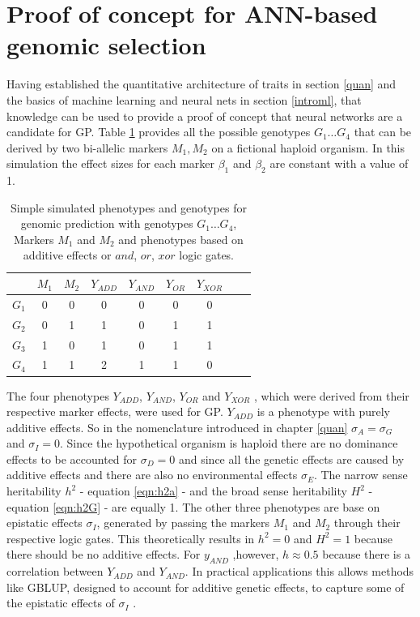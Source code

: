 \section{Proof of concept for ANN-based genomic selection} \label{POC}

Having established the quantitative architecture of traits in section \ref{quan} and the
basics of machine learning and neural nets in section \ref{introml}, that knowledge can be
used to provide a proof of concept that neural networks are a candidate for GP. Table
\ref{tab:simmarker} provides all the possible genotypes $G_1 \dots G_4$ that can be
derived by two bi-allelic markers $M_1,M_2$ on a fictional haploid organism. In this
simulation the effect sizes for each marker $\beta_1$ and $\beta_2$ are constant with a
value of 1.

\begin{table}[H]
  \caption{Simple simulated phenotypes and genotypes for genomic prediction with genotypes
    $G_1 \dots G_4$, Markers $M_1$ and $M_2$ and phenotypes based on additive effects or
    $and$, $or$, $xor$ logic gates.}
\label{tab:simmarker}
\centering
\begin{tabular}{ l c c | c c c c c c }
  \toprule
  & $M_1$ & $M_2$ & $Y_{ADD}$ & $Y_{AND}$ & $Y_{OR}$ & $Y_{XOR}$\\
  \midrule
  $G_1$ & 0 & 0 & 0 & 0 & 0 & 0 \\
  $G_2$ & 0 & 1 & 1 & 0 & 1 & 1 \\
  $G_3$ & 1 & 0 & 1 & 0 & 1 & 1 \\
  $G_4$ & 1 & 1 & 2 & 1 & 1 & 0 \\
  \bottomrule
\end{tabular}
\end{table}

The four phenotypes $Y_{ADD}$, $Y_{AND}$, $Y_{OR}$ and $Y_{XOR}$ , which were derived from
their respective marker effects, were used for GP. $Y_{ADD}$ is a phenotype with purely
additive effects. So in the nomenclature introduced in chapter \ref{quan}
$\sigma_A = \sigma_G$ and $\sigma_{I} = 0$. Since the hypothetical organism is haploid
there are no dominance effects to be accounted for $\sigma_D = 0$ and since all the
genetic effects are caused by additive effects and there are also no environmental effects
$\sigma_E$.  The narrow sense heritability $h^2$ - equation \ref{eqn:h2a} - and the broad
sense heritability $H^2$ - equation \ref{eqn:h2G} - are equally 1. The other three
phenotypes are base on epistatic effects $\sigma_I$, generated by passing the markers
$M_1$ and $M_2$ through their respective logic gates. This theoretically results in
$h^2 = 0$ and $H^2 = 1$ because there should be no additive effects. For $y_{AND}$
,however, $h \approx 0.5$ because there is a correlation between $Y_{ADD}$ and
$Y_{AND}$. In practical applications this allows methods like GBLUP, designed to account
for additive genetic effects, to capture some of the epistatic effects of $\sigma_I$
\cite{vieira2017assessing}.

